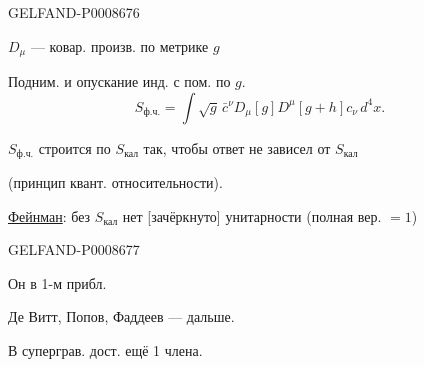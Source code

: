 \begin{GelfandAdjacentEvidence}{GELFAND-P000867}{6}


$D_\mu$ --- ковар. произв. по метрике $g$

Подним. и опускание инд. с пом. по $g$.
\begin{equation*}
S_{\text{ф.ч.}}=\int\sqrt{g}\,\bar c^{\nu}D_\mu[g]D^{\mu}[g+h]c_\nu\,d^4x. \tag{8}
\end{equation*}

$S_{\text{ф.ч.}}$ строится по $S_{\text{кал}}$ так, чтобы ответ не зависел от $S_{\text{кал}}$

(принцип квант. относительности).

 \underline{Фейнман}: без $S_{\text{кал}}$ нет \textcolor{orange!65!black}{[зачёркнуто]} унитарности (полная вер. $=1$)
\end{GelfandAdjacentEvidence}
\begin{GelfandAdjacentEvidence}{GELFAND-P000867}{7}


Он в 1-м прибл.

Де Витт, Попов, Фаддеев --- дальше.

\end{GelfandAdjacentEvidence}


В суперграв. дост. ещё 1 члена.



